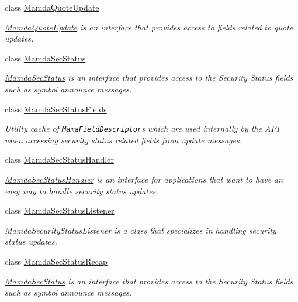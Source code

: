 \begin{CompactItemize}
class \hyperlink{classWombat_1_1MamdaQuoteUpdate}{Mamda\-Quote\-Update}
\begin{CompactList}\small\item\em \hyperlink{classWombat_1_1MamdaQuoteUpdate}{Mamda\-Quote\-Update} is an interface that provides access to fields related to quote updates. \item\end{CompactList}\item 
class \hyperlink{classWombat_1_1MamdaSecStatus}{Mamda\-Sec\-Status}
\begin{CompactList}\small\item\em \hyperlink{classWombat_1_1MamdaSecStatus}{Mamda\-Sec\-Status} is an interface that provides access to the Security Status fields such as symbol announce messages. \item\end{CompactList}\item 
class \hyperlink{classWombat_1_1MamdaSecStatusFields}{Mamda\-Sec\-Status\-Fields}
\begin{CompactList}\small\item\em Utility cache of {\tt Mama\-Field\-Descriptor}s which are used internally by the API when accessing security status related fields from update messages. \item\end{CompactList}\item 
class \hyperlink{classWombat_1_1MamdaSecStatusHandler}{Mamda\-Sec\-Status\-Handler}
\begin{CompactList}\small\item\em \hyperlink{classWombat_1_1MamdaSecStatusHandler}{Mamda\-Sec\-Status\-Handler} is an interface for applications that want to have an easy way to handle security status updates. \item\end{CompactList}\item 
class \hyperlink{classWombat_1_1MamdaSecStatusListener}{Mamda\-Sec\-Status\-Listener}
\begin{CompactList}\small\item\em Mamda\-Security\-Status\-Listener is a class that specializes in handling security status updates. \item\end{CompactList}\item 
class \hyperlink{classWombat_1_1MamdaSecStatusRecap}{Mamda\-Sec\-Status\-Recap}
\begin{CompactList}\small\item\em \hyperlink{classWombat_1_1MamdaSecStatus}{Mamda\-Sec\-Status} is an interface that provides access to the Security Status fields such as symbol announce messages. \item\end{CompactList}\item 

\end{CompactItemize}
